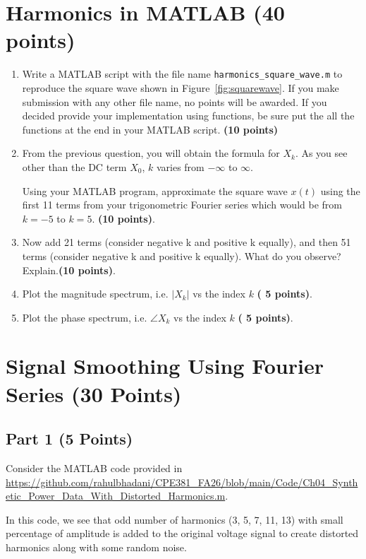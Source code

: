 \documentclass[12pt, xcolor=dvipsnames,svgnames,x11names]{article}
\begin{document}
\section{Harmonics in MATLAB (40 points)}
\begin{enumerate}
    \item Write a MATLAB script with the file name \texttt{harmonics\_square\_wave.m} to reproduce the square wave shown in Figure~\ref{fig:squarewave}. If you make submission with any other file name, no points will be awarded. If you decided provide your implementation using functions, be sure put the all the functions at the end in your MATLAB script. \hfill    \textbf{(10 points)}
    \item From the previous question, you will obtain the formula for $X_k$. As you see other than the DC term $X_0$, $k$ varies from $-\infty$ to $\infty$.

    Using your MATLAB program, approximate the square wave $x(t)$ using the first 11 terms from your trigonometric Fourier series which would be from $k= -5$ to $k=5$.  \textbf{(10 points)}.

    \item Now add 21 terms (consider negative k and positive k equally), and then 51 terms (consider negative k and positive k equally). What do you observe? Explain.\hfill  \textbf{(10 points)}.

    \item Plot the magnitude spectrum, i.e. $|X_k|$ vs the index $k$ \hfill \textbf{( 5 points)}.
    \item Plot the phase spectrum, i.e. $\angle X_k$ vs the index $k$ \hfill \textbf{( 5 points)}.
    
\end{enumerate}



\section{Signal Smoothing Using Fourier Series (30 Points)}

\subsection{Part 1 (5 Points)}

Consider the MATLAB code provided in \url{https://github.com/rahulbhadani/CPE381_FA26/blob/main/Code/Ch04_Synthetic_Power_Data_With_Distorted_Harmonics.m}.

In this code, we see that odd number of harmonics (3, 5, 7, 11, 13) with small percentage of amplitude is added to the original voltage signal to create distorted harmonics along with some random noise.
\end{document}
